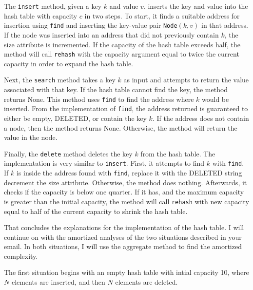 \documentclass[11pt]{article}
\begin{document}
    The \texttt{insert} method, given a key \(k\) and value \(v\), inserts the key and value into the hash table with capacity \(c\) in two steps. To start, it finds a suitable address for insertion using \texttt{find} and inserting the key-value pair \texttt{Node}\((k,v)\) in that address. If the node was inserted into an address that did not previously contain \(k\), the size attribute is incremented. If the capacity of the hash table exceeds half, the method will call \texttt{rehash} with the capacity argument equal to twice the current capacity in order to expand the hash table.

    Next, the \texttt{search} method takes a key \(k\) as input and attempts to return the value associated with that key. If the hash table cannot find the key, the method returns None. This method uses \texttt{find} to find the address where \(k\) would be inserted. From the implementation of \texttt{find}, the address returned is guaranteed to either be empty, DELETED, or contain the key \(k\). If the address does not contain a node, then the method returns None. Otherwise, the method will return the value in the node.

    Finally, the \texttt{delete} method deletes the key \(k\) from the hash table. The implementation is very similar to \texttt{insert}. First, it attempts to find \(k\) with \texttt{find}. If \(k\) is inside the address found with \texttt{find}, replace it with the DELETED string decrement the size attribute. Otherwise, the method does nothing. Afterwards, it checks if the capacity is below one quarter. If it has, and the maximum capacity is greater than the initial capacity, the method will call \texttt{rehash} with new capacity equal to half of the current capacity to shrink the hash table.

    That concludes the explanations for the implementation of the hash table. I will continue on with the amortized analyses of the two situations described in your email. In both situations, I will use the aggregate method to find the amortized complexity.

    The first situation begins with an empty hash table with intial capacity 10, where \(N\) elements are inserted, and then \(N\) elements are deleted.
\end{document}
